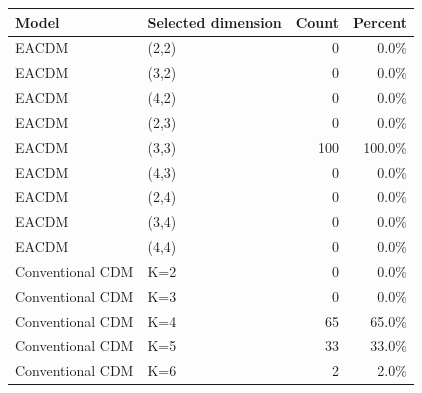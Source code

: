 \begin{tabular}{llrr}
\hline
Model & Selected dimension & Count & Percent \\
\hline
EACDM & (2,2) & 0 & 0.0\% \\
EACDM & (3,2) & 0 & 0.0\% \\
EACDM & (4,2) & 0 & 0.0\% \\
EACDM & (2,3) & 0 & 0.0\% \\
EACDM & (3,3) & 100 & 100.0\% \\
EACDM & (4,3) & 0 & 0.0\% \\
EACDM & (2,4) & 0 & 0.0\% \\
EACDM & (3,4) & 0 & 0.0\% \\
EACDM & (4,4) & 0 & 0.0\% \\
Conventional CDM & K=2 & 0 & 0.0\% \\
Conventional CDM & K=3 & 0 & 0.0\% \\
Conventional CDM & K=4 & 65 & 65.0\% \\
Conventional CDM & K=5 & 33 & 33.0\% \\
Conventional CDM & K=6 & 2 & 2.0\% \\
\hline
\end{tabular}
